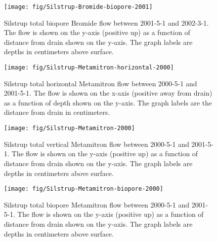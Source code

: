 \begin{figure}[htbp]
  \centering
  \texttt{[image: fig/Silstrup-Bromide-biopore-2001]}
  
  \caption{Silstrup total biopore Bromide flow between 2001-5-1 and
    2002-3-1.  The flow is shown on the y-axis (positive up) as a
    function of distance from drain shown on the y-axis.  The graph
    labels are depths in centimeters above surface.}
  \label{fig:Silstrup-Bromide-biopore-2001}
\end{figure}\FloatBarrier

\begin{figure}[htbp]
  \centering
  \texttt{[image: fig/Silstrup-Metamitron-horizontal-2000]}
  
  \caption{Silstrup total horizontal Metamitron flow between 2000-5-1 and
    2001-5-1.  The flow is shown on the x-axis (positive away from
    drain) as a function of depth shown on the y-axis.  The graph
    labels are the distance from drain in centimeters.}
  \label{fig:Silstrup-Metamitron-2000-horizontal}
\end{figure}\FloatBarrier

\begin{figure}[htbp]
  \centering
  \texttt{[image: fig/Silstrup-Metamitron-2000]}
  
  \caption{Silstrup total vertical Metamitron flow between 2000-5-1 and
    2001-5-1.  The flow is shown on the y-axis (positive up) as a
    function of distance from drain shown on the y-axis.  The graph
    labels are depths in centimeters above surface.}
  \label{fig:Silstrup-Metamitron-2000-vertical}
\end{figure}\FloatBarrier

\begin{figure}[htbp]
  \centering
  \texttt{[image: fig/Silstrup-Metamitron-biopore-2000]}
  
  \caption{Silstrup total biopore Metamitron flow between 2000-5-1 and
    2001-5-1.  The flow is shown on the y-axis (positive up) as a
    function of distance from drain shown on the y-axis.  The graph
    labels are depths in centimeters above surface.}
  \label{fig:Silstrup-Metamitron-biopore-2000}
\end{figure}\FloatBarrier


